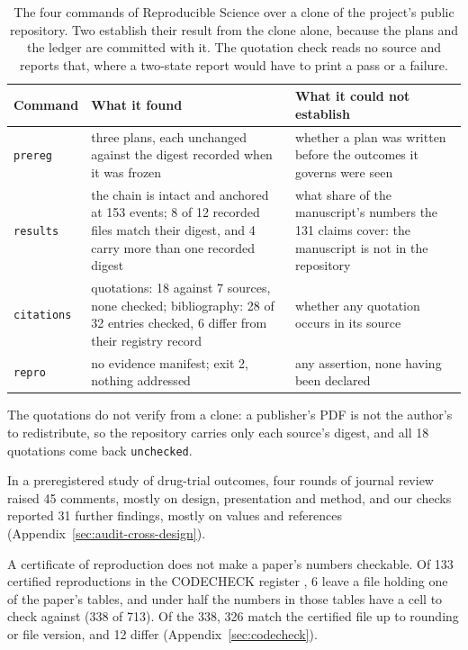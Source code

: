 \documentclass{article}
\newcommand{\code}[1]{\texttt{#1}}
\newcommand{\prereg}{\code{prereg}}
\newcommand{\results}{\code{results}}
\newcommand{\citations}{\code{citations}}
\newcommand{\repro}{\code{repro}}
\begin{document}
\begin{table}[h]
\centering
\small
\caption{The four commands of Reproducible Science over a clone of the project's public repository. Two establish their result
from the clone alone, because the plans and the ledger are committed with it. The quotation check
reads no source and reports that, where a two-state report would have to print a pass or a
failure.}
\label{tab:audit}
\begin{tabular}{@{}>{\raggedright\arraybackslash}p{}>{\raggedright\arraybackslash}p{}>{\raggedright\arraybackslash}p{}@{}}
\toprule
\textbf{Command} & \textbf{What it found} & \textbf{What it could not establish} \\
\midrule
\prereg{} & three plans, each unchanged against the digest recorded when it was frozen & whether a plan was written before the outcomes it governs were seen \\
\results{} & the chain is intact and anchored at 153 events; 8 of 12 recorded files match their digest, and 4 carry more than one recorded digest & what share of the manuscript's numbers the 131 claims cover: the manuscript is not in the repository \\
\citations{} & quotations: 18 against 7 sources, none checked; bibliography: 28 of 32 entries checked, 6 differ from their registry record & whether any quotation occurs in its source \\
\repro{} & no evidence manifest; exit 2, nothing addressed & any assertion, none having been declared \\
\bottomrule
\end{tabular}
\end{table}

The quotations do not verify from a clone: a publisher's PDF is not the author's to redistribute, so the repository
carries only each source's digest, and all 18 quotations come back
\code{unchecked}.

In a preregistered study of drug-trial outcomes, four rounds of journal review raised 45 comments,
mostly on design, presentation and method, and our checks reported 31 further findings, mostly on
values and references (Appendix~\ref{sec:audit-cross-design}).

A certificate of reproduction does not make a paper's numbers checkable. Of 133 certified
reproductions in the CODECHECK register \citep{nust2021codecheck}, 6 leave a file holding one of
the paper's tables, and under half the numbers in those tables have a cell to check against
(338 of 713). Of the 338, 326 match the certified file up to rounding or file version, and 12
differ (Appendix~\ref{sec:codecheck}).
\end{document}
